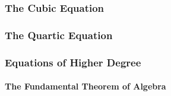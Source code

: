 \subsubsection{The Cubic Equation}

\subsubsection{The Quartic Equation}


\subsubsection{Equations of Higher Degree}

\paragraph{The Fundamental Theorem of Algebra}




\begin{comment}

ToDo:

-introduce positional number systems, in particular decimal and maybe binary as alternative
-give algorithms for long addition, subtraction, multiplication, division
-maybe also for numbers in scientific notation, i.e. floating point numbers
-introduce sum and product notation
 -maybe with a spoiler to infinite sums, use $\sum_{k=1}^{\infty} (1/10)^k = 0.1111... = 1/9$ as example
-introduce sums, products, factorials and binomial coefficients
-but maybe that stuff should go into the "Elementary Algebra" section because it involves 
 variables

References:

https://en.wikipedia.org/wiki/Arithmetic
https://www.britannica.com/science/arithmetic
https://en.wikipedia.org/wiki/Positional_notation
https://en.wikipedia.org/wiki/Mixed_radix


\end{comment}



